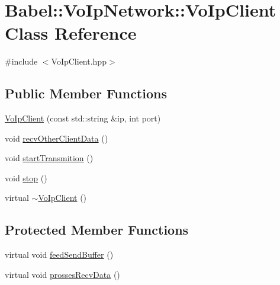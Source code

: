 \hypertarget{classBabel_1_1VoIpNetwork_1_1VoIpClient}{}\section{Babel\+:\+:Vo\+Ip\+Network\+:\+:Vo\+Ip\+Client Class Reference}
\label{classBabel_1_1VoIpNetwork_1_1VoIpClient}


{\ttfamily \#include $<$Vo\+Ip\+Client.\+hpp$>$}

\subsection*{Public Member Functions}
\begin{DoxyCompactItemize}
\item 
\hyperlink{classBabel_1_1VoIpNetwork_1_1VoIpClient_aeab5520c1bdd081222c65ac24bae918b}{Vo\+Ip\+Client} (const std\+::string \&ip, int port)
\item 
void \hyperlink{classBabel_1_1VoIpNetwork_1_1VoIpClient_a9c2b2864481f421ca30e164ba85f22b9}{recv\+Other\+Client\+Data} ()
\item 
void \hyperlink{classBabel_1_1VoIpNetwork_1_1VoIpClient_a9f731999c08bd9af846ab0e17f4bc74b}{start\+Transmition} ()
\item 
void \hyperlink{classBabel_1_1VoIpNetwork_1_1VoIpClient_a38c1cc61effda4fb37b518ab1bafe89e}{stop} ()
\item 
virtual \hyperlink{classBabel_1_1VoIpNetwork_1_1VoIpClient_a7e576b7e84dfc08b4cc08bdf03751265}{$\sim$\+Vo\+Ip\+Client} ()
\end{DoxyCompactItemize}
\subsection*{Protected Member Functions}
\begin{DoxyCompactItemize}
\item 
virtual void \hyperlink{classBabel_1_1VoIpNetwork_1_1VoIpClient_aef58221ea1af2b37717d7e5efeb6b691}{feed\+Send\+Buffer} ()
\item 
virtual void \hyperlink{classBabel_1_1VoIpNetwork_1_1VoIpClient_aa59cc4e1450ec4ff1f4f90fdddef7ed2}{prosses\+Recv\+Data} ()
\end{DoxyCompactItemize}
